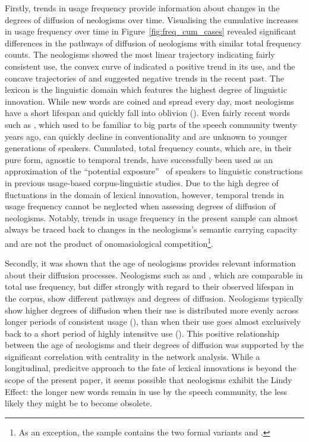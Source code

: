 \documentclass[
  a4paper,
  abstract=on,
  captions=tableabove
  ]{scrartcl}
\begin{document}
    Firstly, trends in usage frequency provide information about changes in the degrees of diffusion of neologisms over time. Visualising the cumulative increases in usage frequency over time in Figure~\ref{fig:freq_cum_cases} revealed significant differences in the pathways of diffusion of neologisms with similar total frequency counts. The neologisms  showed the most linear trajectory indicating fairly consistent use, the convex curve of  indicated a positive trend in its use, and the concave trajectories of  and  suggested negative trends in the recent past. The lexicon is the linguistic domain which features the highest degree of linguistic innovation. While new words are coined and spread every day, most neologisms have a short lifespan and quickly fall into oblivion (\parencite{Algeo1993DesuetudeNew}). Even fairly recent words such as , which used to be familiar to big parts of the speech community twenty years ago, can quickly decline in conventionality and are unknown to younger generations of speakers. Cumulated, total frequency counts, which are, in their pure form, agnostic to temporal trends, have successfully been used as an approximation of the \enquote{potential exposure}~\parencite{Stefanowitsch2017CorpusbasedPerspective} of speakers to linguistic constructions in previous usage-based corpus-linguistic studies. Due to the high degree of fluctuations in the domain of lexical innovation, however, temporal trends in usage frequency cannot be neglected when assessing degrees of diffusion of neologisms. Notably, trends in usage frequency in the present sample can almost always be traced back to changes in the neologisms's semantic carrying capacity and are not the product of onomasiological competition\footnote{As an exception, the sample contains the two formal variants  and .}.

    Secondly, it was shown that the age of neologisms provides relevant information about their diffusion processes. Neologisms such as  and , which are comparable in total use frequency, but differ strongly with regard to their observed lifespan in the corpus, show different pathways and degrees of diffusion. Neologisms typically show higher degrees of diffusion when their use is distributed more evenly across longer periods of consistent usage (), than when their use goes almost exclusively back to a short period of highly intensitve use (). This positive relationship between the age of neologisms and their degrees of diffusion was supported by the significant correlation with centrality in the network analysis. While a longitudinal, predicitve approach to the fate of lexical innovations is beyond the scope of the present paper, it seems possible that neologisms exhibit the Lindy Effect: the longer new words remain in use by the speech community, the less likely they might be to become obsolete.
\end{document}
